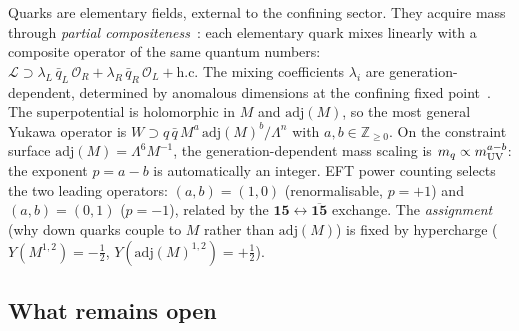 \documentclass[12pt,a4paper]{article}
\newcommand{\adj}{\mathrm{adj}}
\begin{document}
Quarks are elementary fields, external to the confining sector.
They acquire mass through \emph{partial
compositeness}~\cite{Kaplan:1991dc}: each elementary quark mixes
linearly with a composite operator of the same quantum numbers:
$\mathcal{L} \supset \lambda_L\,\bar q_L\,\mathcal{O}_R
+ \lambda_R\,\bar q_R\,\mathcal{O}_L + \text{h.c.}$
The mixing coefficients $\lambda_i$ are generation-dependent,
determined by anomalous dimensions at the confining fixed
point~\cite{Strassler:1995,NelsonStrassler:2000}.
The superpotential is holomorphic in $M$ and $\adj(M)$,
so the most general Yukawa operator is
$W \supset q\,\bar{q}\,M^a\,\adj(M)^b/\Lambda^n$ with
$a, b \in \mathbb{Z}_{\ge 0}$. On the constraint surface
$\adj(M) = \Lambda^6 M^{-1}$, the generation-dependent mass
scaling is $m_q \propto m_{\rm UV}^{a-b}$: the exponent
$p = a - b$ is automatically an integer. EFT power counting
selects the two leading operators: $(a,b) = (1,0)$ (renormalisable,
$p{=}{+}1$) and $(a,b) = (0,1)$ ($p{=}{-}1$), related by the
$\mathbf{15} \leftrightarrow \overline{\mathbf{15}}$ exchange.
The \emph{assignment} (why down quarks couple to $M$ rather than
$\adj(M)$) is fixed by hypercharge
($Y(M^{1,2}) = -\tfrac{1}{2}$, $Y(\adj(M)^{1,2}) = +\tfrac{1}{2}$).

\subsection{What remains open}
\label{sec:open}
\end{document}
